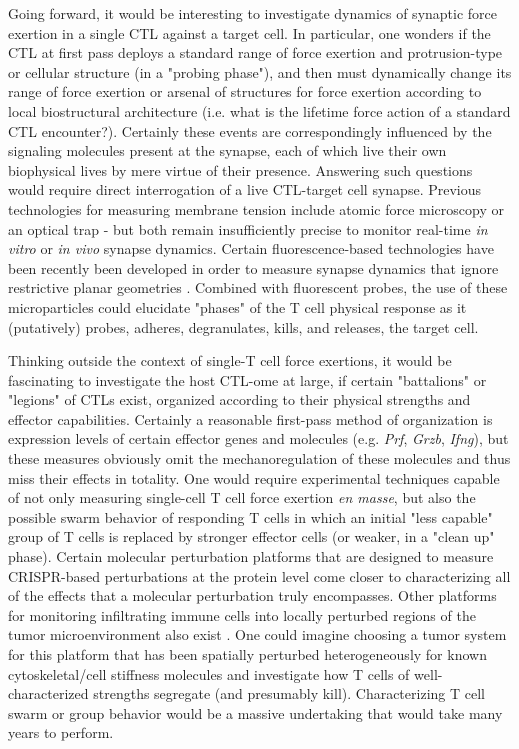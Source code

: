 Going forward, it would be interesting to investigate dynamics of synaptic force exertion in a single CTL against a target cell. In particular, one wonders if the CTL at first pass deploys a standard range of force exertion and protrusion-type or cellular structure (in a "probing phase"), and then must dynamically change its range of force exertion or arsenal of structures for force exertion according to local biostructural architecture (i.e. what is the lifetime force action of a standard CTL encounter?). Certainly these events are correspondingly influenced by the signaling molecules present at the synapse, each of which live their own biophysical lives by mere virtue of their presence. Answering such questions would require direct interrogation of a live CTL-target cell synapse. Previous technologies for measuring membrane tension include atomic force microscopy or an optical trap - but both remain insufficiently precise to monitor real-time \textit{in vitro} or \textit{in vivo} synapse dynamics. Certain fluorescence-based technologies have been recently been developed in order to measure synapse dynamics that ignore restrictive planar geometries \cite{Vorselen2020}. Combined with fluorescent probes, the use of these microparticles could elucidate "phases" of the T cell physical response as it (putatively) probes, adheres, degranulates, kills, and releases, the target cell.

Thinking outside the context of single-T cell force exertions, it would be fascinating to investigate the host CTL-ome at large, if certain "battalions" or "legions" of CTLs exist, organized according to their physical strengths and effector capabilities. Certainly a reasonable first-pass method of organization is expression levels of certain effector genes and molecules (e.g. \textit{Prf}, \textit{Grzb}, \textit{Ifng}), but these measures obviously omit the  mechanoregulation of these molecules and thus miss their effects in totality. One would require  experimental techniques capable of not only measuring single-cell T cell force exertion \textit{en masse}, but also the possible swarm behavior of responding T cells in which an initial "less capable" group of T cells is replaced by stronger effector cells (or weaker, in a "clean up" phase). Certain molecular perturbation platforms that are designed to measure CRISPR-based perturbations at the protein level \cite{Wroblewska2018} come closer to characterizing all of the effects that a molecular perturbation truly encompasses. Other platforms for monitoring infiltrating immune cells into locally perturbed regions of the tumor microenvironment also exist \cite{MaximeDhainaut2021}. One could imagine choosing a tumor system for this platform that has been spatially perturbed heterogeneously for known cytoskeletal/cell stiffness molecules and investigate how T cells of well-characterized strengths segregate (and presumably kill). Characterizing T cell swarm or group behavior would be a massive undertaking that would take many years to perform.

